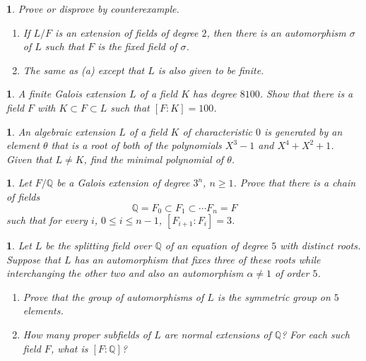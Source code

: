 \documentclass[a4paper,11pt,final,openany]{memoir}
\newtheorem{exercise}[Y]{}
\theoremstyle{nonumberplain}
\begin{document}
\begin{exercise}
\label{x48} Prove or disprove by counterexample.

\begin{enumerate}
\item If $L/F$ is an extension of fields of degree $2$, then there is an
automorphism $\sigma$ of $L$ such that $F$ is the fixed field of $\sigma$.

\item The same as (a) except that $L$ is also given to be finite.
\end{enumerate}
\end{exercise}

\begin{exercise}
\label{x49} A finite Galois extension $L$ of a field $K$ has degree $8100$.
Show that there is a field $F$ with $K\subset F\subset L$ such that $[F\colon
K]=100$.
\end{exercise}

\begin{exercise}
\label{x50} An algebraic extension $L$ of a field $K$ of characteristic $0$ is
generated by an element $\theta$ that is a root of both of the polynomials
$X^{3}-1$ and $X^{4}+X^{2}+1$. Given that $L\neq K$, find the minimal
polynomial of $\theta$.
\end{exercise}

\begin{exercise}
\label{x51} Let $F/{\mathbb{Q}}$ be a Galois extension of degree $3^{n}$,
$n\geq1$. Prove that there is a chain of fields
\[
{\mathbb{Q}}=F_{0}\subset F_{1}\subset\cdots F_{n}=F
\]
such that for every $i$, $0\leq i\leq n-1$, $[F_{i+1}\colon F_{i}]=3$.
\end{exercise}

\begin{exercise}
\label{x52} Let $L$ be the splitting field over ${\mathbb{Q}}$ of an equation
of degree $5$ with distinct roots. Suppose that $L$ has an automorphism that
fixes three of these roots while interchanging the other two and also an
automorphism $\alpha\neq1$ of order $5$.

\begin{enumerate}
\item Prove that the group of automorphisms of $L$ is the symmetric group on
$5$ elements.

\item How many proper subfields of $L$ are normal extensions of ${\mathbb{Q}}%
$? For each such field $F$, what is $[F\colon{\mathbb{Q}}]$?
\end{enumerate}
\end{exercise}
\end{document}
